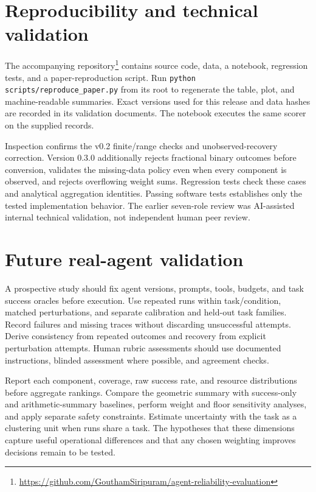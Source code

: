 \documentclass[11pt]{article}
\begin{document}
\section{Reproducibility and technical validation}
The accompanying repository\footnote{\url{https://github.com/GouthamSiripuram/agent-reliability-evaluation}} contains source code, data, a notebook, regression tests, and a paper-reproduction script. Run \texttt{python scripts/reproduce\_paper.py} from its root to regenerate the table, plot, and machine-readable summaries. Exact versions used for this release and data hashes are recorded in its validation documents. The notebook executes the same scorer on the supplied records.

Inspection confirms the v0.2 finite/range checks and unobserved-recovery correction. Version 0.3.0 additionally rejects fractional binary outcomes before conversion, validates the missing-data policy even when every component is observed, and rejects overflowing weight sums. Regression tests check these cases and analytical aggregation identities. Passing software tests establishes only the tested implementation behavior. The earlier seven-role review was AI-assisted internal technical validation, not independent human peer review.

\section{Future real-agent validation}
A prospective study should fix agent versions, prompts, tools, budgets, and task success oracles before execution. Use repeated runs within task/condition, matched perturbations, and separate calibration and held-out task families. Record failures and missing traces without discarding unsuccessful attempts. Derive consistency from repeated outcomes and recovery from explicit perturbation attempts. Human rubric assessments should use documented instructions, blinded assessment where possible, and agreement checks.

Report each component, coverage, raw success rate, and resource distributions before aggregate rankings. Compare the geometric summary with success-only and arithmetic-summary baselines, perform weight and floor sensitivity analyses, and apply separate safety constraints. Estimate uncertainty with the task as a clustering unit when runs share a task. The hypotheses that these dimensions capture useful operational differences and that any chosen weighting improves decisions remain to be tested.
\end{document}

